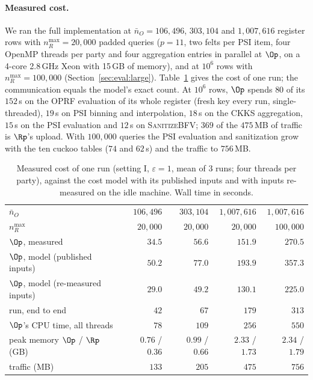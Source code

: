 \paragraph{Measured cost.} We ran the full implementation at $\bar n_O = 106{,}496$, $303{,}104$ and $1{,}007{,}616$ register rows with $n_R^{\max} = 20{,}000$ padded queries ($p = 11$, two felts per PSI item, four OpenMP threads per party and four aggregation entries in parallel at $\Op$, on a 4-core 2.8\,GHz Xeon with 15\,GB of memory), and at $10^6$ rows with $n_R^{\max} = 100{,}000$ (Section~\ref{sec:eval:large}). Table~\ref{tab:cost_large} gives the cost of one run; the communication equals the model's exact count. At $10^6$ rows, $\Op$ spends $80$ of its $152$\,s on the OPRF evaluation of its whole register (fresh key every run, single-threaded), $19$\,s on PSI binning and interpolation, $18$\,s on the CKKS aggregation, $15$\,s on the PSI evaluation and $12$\,s on \textsc{SanitizeBFV}; $369$ of the $475$\,MB of traffic is $\Rp$'s upload. With $100{,}000$ queries the PSI evaluation and sanitization grow with the ten cuckoo tables ($74$ and $62$\,s) and the traffic to $756$\,MB.

\begin{table}[ht]
\centering\small
\caption{Measured cost of one run (setting I, $\varepsilon = 1$, mean of 3 runs; four threads per party), against the cost model with its published inputs and with inputs re-measured on the idle machine. Wall time in seconds.}
\label{tab:cost_large}
\begin{tabular}{@{}lrrrr@{}}
\toprule
$\bar n_O$ & $106{,}496$ & $303{,}104$ & $1{,}007{,}616$ & $1{,}007{,}616$ \\
$n_R^{\max}$ & $20{,}000$ & $20{,}000$ & $20{,}000$ & $100{,}000$ \\
\midrule
$\Op$, measured & $34.5$ & $56.6$ & $151.9$ & $270.5$ \\
$\Op$, model (published inputs) & $50.2$ & $77.0$ & $193.9$ & $357.3$ \\
$\Op$, model (re-measured inputs) & $29.0$ & $49.2$ & $130.1$ & $225.0$ \\
run, end to end & $42$ & $67$ & $179$ & $313$ \\
$\Op$'s CPU time, all threads & $78$ & $109$ & $256$ & $550$ \\
peak memory $\Op$ / $\Rp$ (GB) & $0.76$ / $0.36$ & $0.99$ / $0.66$ & $2.33$ / $1.73$ & $2.34$ / $1.79$ \\
traffic (MB) & $133$ & $205$ & $475$ & $756$ \\
\bottomrule
\end{tabular}
\end{table}

